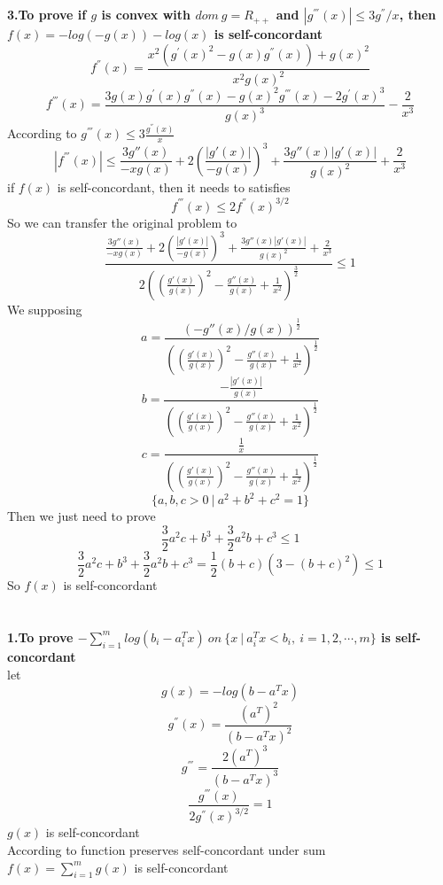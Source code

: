 \documentclass[UTF8]{ctexart}
\begin{document}
\subsection{}
\textbf{3.To prove if $g$ is convex with $dom\ g= R_{++}$ and $|g^{'''}(x)|\leq3g^{''}/x$, then $f(x)=-log(-g(x))-log(x)$ is self-concordant}\\
$$f^{''}(x)=\frac{x^{2}(g^{'}(x)^{2}-g(x)g^{''}(x))+g(x)^{2}}{x^{2}g(x)^{2}}$$
$$f^{'''}(x)=\frac{3g(x)g^{'}(x)g^{''}(x)-g(x)^{2}g^{'''}(x)-2g^{'}(x)^{3}}{g(x)^{3}}-\frac{2}{x^{3}}$$
According to  $g^{'''}(x)\leq3\frac{g^{''}(x)}{x}$
$$|f^{'''}(x)|\leq\frac{3g''(x)}{-xg(x)}+2(\frac{|g'(x)|}{-g(x)})^{3}+\frac{3g''(x)|g'(x)|}{g(x)^{2}}+\frac{2}{x^{3}}$$
if $f(x)$ is self-concordant, then it needs  to satisfies
$$f^{'''}(x)\leq2f^{''}(x)^{3/2}$$
So we can transfer the original problem to
$$\frac{\frac{3g''(x)}{-xg(x)}+2(\frac{|g'(x)|}{-g(x)})^{3}+\frac{3g''(x)|g'(x)|}{g(x)^{2}}+\frac{2}{x^{3}}}{2((\frac{g'(x)}{g(x)})^{2}-\frac{g''(x)}{g(x)}+\frac{1}{x^{2}})^{\frac{3}{2}}}\leq 1$$
We supposing
$$a=\frac{(-g''(x)/g(x))^{\frac{1}{2}}}{((\frac{g'(x)}{g(x)})^{2}-\frac{g''(x)}{g(x)}+\frac{1}{x^{2}})^{\frac{1}{2}}}$$
$$b=\frac{-\frac{|g'(x)|}{g(x)}}{((\frac{g'(x)}{g(x)})^{2}-\frac{g''(x)}{g(x)}+\frac{1}{x^{2}})^{\frac{1}{2}}}$$
$$c=\frac{\frac{1}{x}}{((\frac{g'(x)}{g(x)})^{2}-\frac{g''(x)}{g(x)}+\frac{1}{x^{2}})^{\frac{1}{2}}}$$
$$\{a,b,c>0\ |\ a^{2}+b^{2}+c^{2}=1\}$$
Then we just need to prove
$$\frac{3}{2}a^{2}c+b^{3}+\frac{3}{2}a^{2}b+c^{3}\leq1$$
$$\frac{3}{2}a^{2}c+b^{3}+\frac{3}{2}a^{2}b+c^{3}=\frac{1}{2}(b+c)(3-(b+c)^{2})\leq1$$
So $f(x)$ is self-concordant\\

\section{}
\subsection{}
\textbf{1.To prove $-\sum\limits_{i=1}^{m}log(b_{i}-a_{i}^{T}x)\ on\ \{x\ |\ a_{i}^{T}x<b_{i},\ i=1,2,\cdots,m\}$ is self-concordant}\\
let $$g(x)=-log(b-a^{T}x)$$
$$g^{''}(x)=\frac{(a^{T})^{2}}{(b-a^{T}x)^{2}}$$
$$g^{'''}=\frac{2(a^{T})^{3}}{(b-a^{T}x)^{3}}$$
$$\frac{g^{'''}(x)}{2g^{''}(x)^{3/2}}=1$$
$g(x)$ is self-concordant\\
According to function preserves self-concordant under sum\\
$f(x)=\sum\limits_{i=1}^{m}g(x)$ is self-concordant\\
\end{document}
